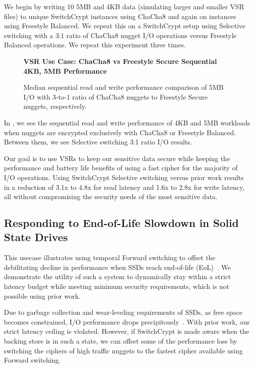 We begin by writing 10 5MB and 4KB data (simulating larger and smaller VSR
files) to unique SwitchCrypt instances using ChaCha8 and again on instances
using Freestyle Balanced. We repeat this on a SwitchCrypt setup using Selective
switching with a 3:1 ratio of ChaCha8 nugget I/O operations versus Freestyle
Balanced operations. We repeat this experiment three times.

\begin{figure}[ht] \textbf{VSR Use Case: ChaCha8 vs Freestyle Secure Sequential
4KB, 5MB Performance}\par\medskip
   \centering
   {} \caption{Median sequential read and
   write performance comparison of 5MB I/O with 3-to-1 ratio of ChaCha8 nuggets
   to Freestyle Secure nuggets, respectively.}
  \label{fig:usecase-vsr-bar}
\end{figure}

In , we see the sequential read and write performance of
4KB and 5MB workloads when nuggets are encrypted exclusively with ChaCha8 or
Freestyle Balanced. Between them, we see Selective switching 3:1 ratio I/O
results.

Our goal is to use VSRs to keep our sensitive data secure while keeping the
performance and battery life benefits of using a fast cipher for the majority of
I/O operations. Using SwitchCrypt Selective switching versus prior work results
in a reduction of 3.1x to 4.8x for read latency and 1.6x to 2.8x for write
latency, all without compromising the security needs of the most sensitive data.

\subsection{Responding to End-of-Life Slowdown in Solid State Drives}\label{subsec:uc3}

This usecase illustrates using temporal Forward switching to offset the
debilitating decline in performance when SSDs reach end-of-life
(EoL)~\cite{SSDEOL1, SSDEOL2, SSDEOL3}. We demonstrate the utility of such a
system to dynamically stay within a strict latency budget while meeting minimum
security requirements, which is not possible using prior work.

Due to garbage collection and wear-leveling requirements of SSDs, as free space
becomes constrained, I/O performance drops precipitously~\cite{SSDEOL1, SSDEOL2,
SSDEOL3}. With prior work, our strict latency ceiling is violated. However, if
SwitchCrypt is made aware when the backing store is in such a state, we can
offset some of the performance loss by switching the ciphers of high traffic
nuggets to the fastest cipher available using Forward switching.

